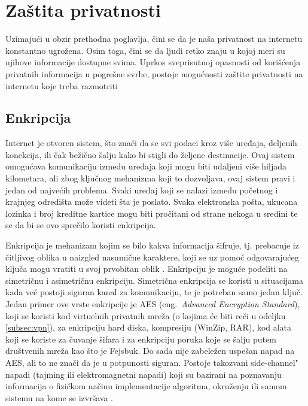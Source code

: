 \documentclass[a4paper]{article}
\begin{document}
\section{Zaštita privatnosti}
\label{sec:zastita}
Uzimajući u obzir prethodna poglavlja, čini se da je naša privatnost na internetu konstantno ugrožena. Osim toga, čini se da ljudi retko znaju u kojoj meri su njihove informacije dostupne svima. Uprkos sveprisutnoj opasnosti od korišćenja privatnih informacija u pogrešne svrhe, postoje mogućnosti zaštite privatnosti na internetu koje treba razmotriti

\subsection{Enkripcija} 

Internet je otvoren sistem, što znači da se svi podaci kroz više uređaja, deljenih konekcija, ili čak bežično šalju kako bi stigli do željene destinacije. Ovaj sistem omogućava komunikaciju između uređaja koji mogu biti udaljeni više hiljada kilometara, ali zbog ključnog mehanizma koji to dozvoljava, ovaj sistem pravi i jedan od najvećih problema. Svaki uređaj koji se nalazi između početnog i krajnjeg odredišta može videti šta je poslato. Svaka elektronska pošta, ukucana lozinka i broj kreditne kartice mogu biti pročitani od strane nekoga u sredini te se da bi se ovo sprečilo koristi enkripcija.
\par Enkripcija je mehanizam kojim se bilo kakva informacija šifruje, tj. prebacuje iz čitljivog oblika u naizgled nasumične karaktere, koji se uz pomoć odgovarajućeg ključa mogu vratiti u svoj prvobitan oblik \cite{dataencryption}. Enkripciju je moguće podeliti na simetričnu i asimetričnu enkripciju. Simetrična enkripcija se koristi u situacijama kada već postoji siguran kanal za komunikaciju, te je potreban samo jedan ključ. Jedan primer ove vrste enkripcije je AES (eng.~{\em Advanced Encryption Standard}), koji se koristi kod virtuelnih privatnih mreža (o kojima će biti reči u  odeljku \ref{subsec:vpn}), za enkripciju hard diska, kompresiju (WinZip,  RAR), kod alata koji se koriste za čuvanje šifara i za enkripciju poruka koje se šalju putem društvenih mreža kao što je Fejsbuk. Do sada nije zabeležen uspešan napad na AES, ali to ne znači da je u potpunosti siguran.  Postoje takozvani side-channel" napadi (tajming ili elektromagnetni napadi) koji su bazirani na poznavanju informacija o fizičkom načinu implementacije algoritma, okruženju ili samom sistemu na kome se izvršava \cite{aes}. 
\end{document}
